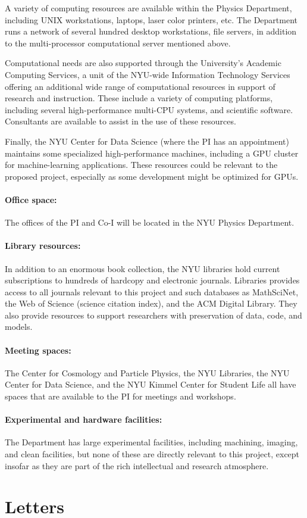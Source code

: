 \documentclass[12pt]{article}
\begin{document}
A variety of computing resources are available within the Physics
Department, including UNIX workstations, laptops, laser color
printers, etc.  The Department runs a network of several hundred
desktop workstations, file servers, in addition to the multi-processor
computational server mentioned above.

Computational needs are also supported through the University's
Academic Computing Services, a unit of the NYU-wide Information
Technology Services offering an additional wide range of computational
resources in support of research and instruction.  These include a
variety of computing platforms, including several high-performance
multi-CPU systems, and scientific software.  Consultants are available
to assist in the use of these resources.

Finally, the NYU Center for Data Science (where the PI has an appointment)
maintains some specialized high-performance machines, including a GPU
cluster for machine-learning
applications. These resources could be relevant to the proposed project,
especially as some development might be optimized for GPUs.

\paragraph{Office space:}
The offices of the PI and Co-I will be located in the NYU Physics
Department.

\paragraph{Library resources:}
In addition to an enormous book collection, the NYU libraries hold
current subscriptions to hundreds of hardcopy and electronic journals.
Libraries provides access to all journals relevant to this project and such
databases as MathSciNet, the Web of Science (science citation index),
and the ACM Digital Library. They also provide resources to support
researchers with preservation of data, code, and models.

\paragraph{Meeting spaces:}
The Center for Cosmology and Particle Physics, the NYU Libraries, the
NYU Center for Data Science, and the NYU Kimmel Center for Student
Life all have spaces that are available to the PI for meetings and
workshops.

\paragraph{Experimental and hardware facilities:}
The Department has large experimental facilities, including machining,
imaging, and clean facilities, but none of these are directly relevant
to this project, except insofar as they are part of the rich
intellectual and research atmosphere.

\clearpage
\section{Letters}
\end{document}
